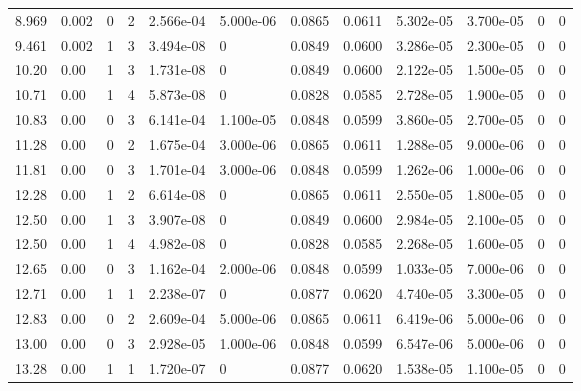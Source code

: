 \documentclass[preview]{standalone}
\begin{document}
{{\begin{tabular}{L{1.2cm}C{1.2cm} C{0.3cm}C{0.5cm} C{1.4cm}C{1.4cm} C{1.4cm}C{1.4cm} C{1.6cm}C{1.6cm} C{1.6cm}C{1.6cm}}
  8.969  &  0.002  & 0     &  2 &  2.566e-04  & 5.000e-06  &  0.0865&   0.0611& 5.302e-05 & 3.700e-05   &  0 & 0  \\ 
  9.461  &  0.002  & 1     &  3 &  3.494e-08  & 0  &  0.0849&   0.0600& 3.286e-05 & 2.300e-05   &  0 & 0  \\ 
  10.20  &  0.00  & 1     &  3 &  1.731e-08  & 0  &  0.0849&   0.0600& 2.122e-05 & 1.500e-05   &  0 & 0  \\ 
  10.71  &  0.00  & 1     &  4 &  5.873e-08  & 0  &  0.0828&   0.0585& 2.728e-05 & 1.900e-05   &  0 & 0  \\ 
  10.83  &  0.00  & 0     &  3 &  6.141e-04  & 1.100e-05  &  0.0848&   0.0599& 3.860e-05 & 2.700e-05   &  0 & 0  \\ 
  11.28  &  0.00  & 0     &  2 &  1.675e-04  & 3.000e-06  &  0.0865&   0.0611& 1.288e-05 & 9.000e-06   &  0 & 0  \\ 
  11.81  &  0.00  & 0     &  3 &  1.701e-04  & 3.000e-06  &  0.0848&   0.0599& 1.262e-06 & 1.000e-06   &  0 & 0  \\ 
  12.28  &  0.00  & 1     &  2 &  6.614e-08  & 0  &  0.0865&   0.0611& 2.550e-05 & 1.800e-05   &  0 & 0  \\ 
  12.50  &  0.00  & 1     &  3 &  3.907e-08  & 0  &  0.0849&   0.0600& 2.984e-05 & 2.100e-05   &  0 & 0  \\ 
  12.50  &  0.00  & 1     &  4 &  4.982e-08  & 0  &  0.0828&   0.0585& 2.268e-05 & 1.600e-05   &  0 & 0  \\ 
  12.65  &  0.00  & 0     &  3 &  1.162e-04  & 2.000e-06  &  0.0848&   0.0599& 1.033e-05 & 7.000e-06   &  0 & 0  \\ 
  12.71  &  0.00  & 1     &  1 &  2.238e-07  & 0  &  0.0877&   0.0620& 4.740e-05 & 3.300e-05   &  0 & 0  \\ 
  12.83  &  0.00  & 0     &  2 &  2.609e-04  & 5.000e-06  &  0.0865&   0.0611& 6.419e-06 & 5.000e-06   &  0 & 0  \\ 
  13.00  &  0.00  & 0     &  3 &  2.928e-05  & 1.000e-06  &  0.0848&   0.0599& 6.547e-06 & 5.000e-06   &  0 & 0  \\ 
  13.28  &  0.00  & 1     &  1 &  1.720e-07  & 0  &  0.0877&   0.0620& 1.538e-05 & 1.100e-05   &  0 & 0  \\ 
\hline 
\end{tabular} 

}}
\end{document}
